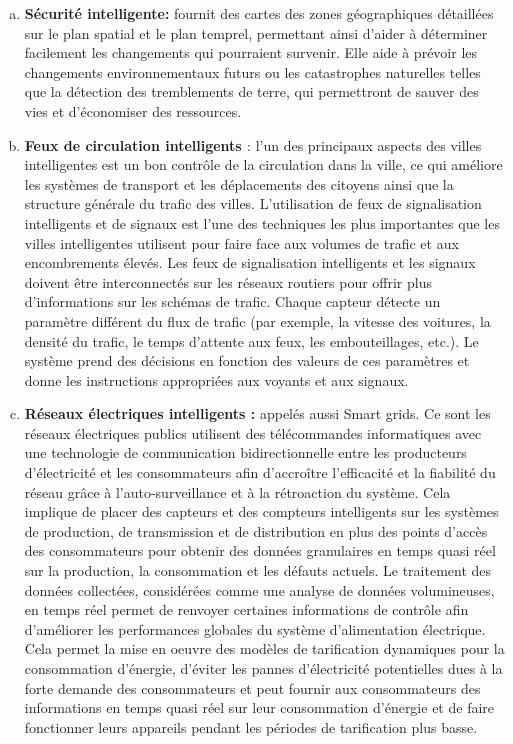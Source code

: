 \documentclass[french, a4paper, 12pt]{report}
\begin{document}
\begin{enumerate}[a.]
\item \textbf{Sécurité intelligente:} fournit des cartes des zones géographiques détaillées sur le plan spatial et le plan temprel, permettant ainsi d’aider à déterminer facilement les changements qui pourraient survenir.
Elle aide à prévoir les changements environnementaux futurs ou les catastrophes naturelles telles que la détection des tremblements de terre, qui permettront de sauver des vies et d'économiser des ressources.\\

\item \textbf{Feux de circulation intelligents \cite{7}} : l’un des principaux aspects des villes intelligentes est un bon contrôle de la circulation dans la ville, ce qui améliore les systèmes de transport et les déplacements des citoyens ainsi que la structure générale du trafic des villes. L'utilisation de feux de signalisation intelligents et de signaux est l'une des techniques les plus importantes que les villes intelligentes utilisent pour faire face aux volumes de trafic et aux encombrements élevés. Les feux de signalisation intelligents et les signaux doivent être interconnectés sur les réseaux routiers pour offrir plus d'informations sur les schémas de trafic. Chaque capteur détecte un paramètre différent du flux de trafic (par exemple, la vitesse des voitures, la densité du trafic, le temps d'attente aux feux, les embouteillages, etc.). Le système prend des décisions en fonction des valeurs de ces paramètres et donne les instructions appropriées aux voyants et aux signaux.\\

\item \textbf{Réseaux électriques intelligents :} appelés aussi Smart grids. Ce sont les réseaux électriques publics utilisent des télécommandes informatiques avec une technologie de communication bidirectionnelle entre les producteurs d'électricité et les consommateurs afin d'accroître l'efficacité et la fiabilité du réseau grâce à l'auto-surveillance et à la rétroaction du système. Cela implique de placer des capteurs et des compteurs intelligents sur les systèmes de production, de transmission et de distribution en plus des points d'accès des consommateurs pour obtenir des données granulaires en temps quasi réel sur la production, la consommation et les défauts actuels. Le traitement des données collectées, considérées comme une analyse de données volumineuses, en temps réel permet de renvoyer certaines informations de contrôle afin d'améliorer les performances globales du système d'alimentation électrique.
Cela permet la mise en oeuvre des modèles de tarification dynamiques pour la consommation d'énergie, d’éviter les pannes d’électricité potentielles dues à la forte demande des consommateurs et peut fournir aux consommateurs des informations en temps quasi réel sur leur consommation d'énergie et de faire fonctionner leurs appareils pendant les périodes de tarification plus basse.\\ 

\end{enumerate}
\end{document}
